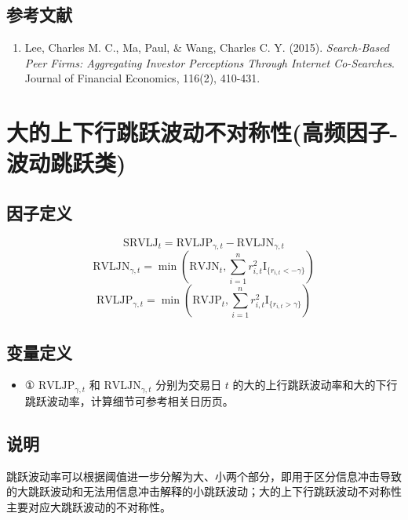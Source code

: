 \documentclass{article}
\begin{document}
\subsection{参考文献}
\begin{enumerate}
    \item Lee, Charles M. C., Ma, Paul, \& Wang, Charles C. Y. (2015). \textit{Search-Based Peer Firms: Aggregating Investor Perceptions Through Internet Co-Searches}. Journal of Financial Economics, 116(2), 410-431.
\end{enumerate}

\section{大的上下行跳跃波动不对称性(高频因子-波动跳跃类)}

\subsection{因子定义}
\begin{equation}
    \mathrm{SRVLJ}_t = \mathrm{RVLJP}_{\gamma,t} - \mathrm{RVLJN}_{\gamma,t}
\end{equation}
\begin{equation}
    \mathrm{RVLJN}_{\gamma,t} = \min\left(\mathrm{RVJN}_t, \sum_{i=1}^n r_{i,t}^2 \mathrm{I}_{\{r_{i,t} < -\gamma\}}\right)
\end{equation}
\begin{equation}
    \mathrm{RVLJP}_{\gamma,t} = \min\left(\mathrm{RVJP}_t, \sum_{i=1}^n r_{i,t}^2 \mathrm{I}_{\{r_{i,t} > \gamma\}}\right)
\end{equation}

\subsection{变量定义}
\begin{itemize}
    \item ① \( \mathrm{RVLJP}_{\gamma,t} \) 和 \( \mathrm{RVLJN}_{\gamma,t} \) 分别为交易日 \( t \) 的大的上行跳跃波动率和大的下行跳跃波动率，计算细节可参考相关日历页。
\end{itemize}

\subsection{说明}
跳跃波动率可以根据阈值进一步分解为大、小两个部分，即用于区分信息冲击导致的大跳跃波动和无法用信息冲击解释的小跳跃波动；大的上下行跳跃波动不对称性主要对应大跳跃波动的不对称性。
\end{document}
